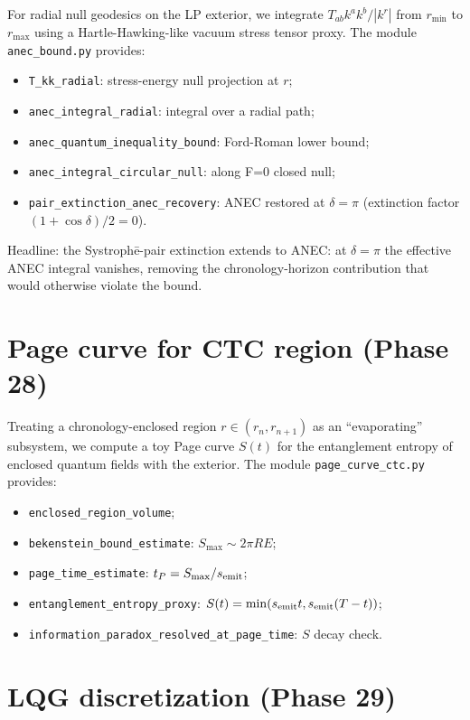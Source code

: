 \documentclass[11pt,a4paper]{article}
\begin{document}
For radial null geodesics on the LP exterior, we integrate
$T_{ab} k^a k^b / |k^r|$ from $r_{\min}$ to $r_{\max}$ using a
Hartle-Hawking-like vacuum stress tensor proxy. The module
\texttt{anec\_bound.py} provides:
\begin{itemize}
\item \texttt{T\_kk\_radial}: stress-energy null projection at $r$;
\item \texttt{anec\_integral\_radial}: integral over a radial path;
\item \texttt{anec\_quantum\_inequality\_bound}: Ford-Roman lower bound;
\item \texttt{anec\_integral\_circular\_null}: along F=0 closed null;
\item \texttt{pair\_extinction\_anec\_recovery}: ANEC restored at
  $\delta = \pi$ (extinction factor $(1+\cos\delta)/2 = 0$).
\end{itemize}

Headline: the Systroph\=e-pair extinction extends to ANEC: at
$\delta = \pi$ the effective ANEC integral vanishes, removing the
chronology-horizon contribution that would otherwise violate the
bound.

\section{Page curve for CTC region (Phase 28)}

Treating a chronology-enclosed region $r \in (r_n, r_{n+1})$ as an
``evaporating'' subsystem, we compute a toy Page curve $S(t)$ for the
entanglement entropy of enclosed quantum fields with the exterior.
The module \texttt{page\_curve\_ctc.py} provides:
\begin{itemize}
\item \texttt{enclosed\_region\_volume};
\item \texttt{bekenstein\_bound\_estimate}: $S_{\max} \sim 2 \pi R E$;
\item \texttt{page\_time\_estimate}: $t_P = S_{\max} / s_{\rm emit}$;
\item \texttt{entanglement\_entropy\_proxy}: $S(t) = \min(s_{\rm emit} t,
  s_{\rm emit}(T - t))$;
\item \texttt{information\_paradox\_resolved\_at\_page\_time}: $S$ decay check.
\end{itemize}

\section{LQG discretization (Phase 29)}
\end{document}
